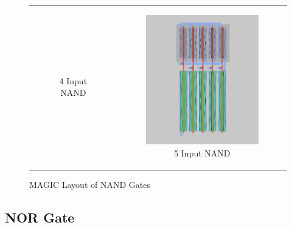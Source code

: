 \documentclass[conference]{IEEEtran}
\begin{document}
\begin{figure}[H]
\begin{tabular}{cc}
\begin{subfigure}{0.44\linewidth}
            \caption{4 Input NAND}
        \end{subfigure} &
        \begin{subfigure}{0.44\linewidth}
            \centering
            \includegraphics[width=\textwidth]{images/nand_5_cmos_layout.png}
            \caption{5 Input NAND}
        \end{subfigure}
    \end{tabular}
    \caption{MAGIC Layout of NAND Gates}
\end{figure}

\subsection{NOR Gate}
\end{document}
